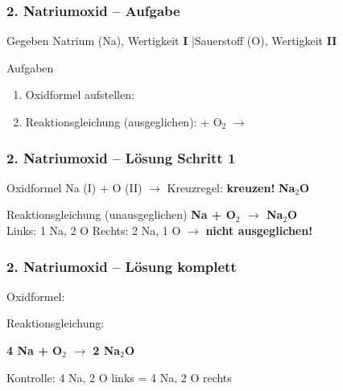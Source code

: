 \documentclass[aspectratio=169, 12pt]{beamer}
\newcommand{\lsg}[1]{\textcolor{loesung}{\textbf{#1}}}
\newcommand{\luecke}{\underline{\hspace{2.5cm}}}
\begin{document}
\begin{frame}
\frametitle{2. Natriumoxid – Aufgabe}
\begin{block}{Gegeben}
Natrium (Na), Wertigkeit \textbf{I} \quad|\quad Sauerstoff (O), Wertigkeit \textbf{II}
\end{block}
\vspace{0.5cm}
\begin{block}{Aufgaben}
\begin{enumerate}
\item Oxidformel aufstellen: \luecke
\item Reaktionsgleichung (ausgeglichen): \quad \luecke{} + O$_2$ $\rightarrow$ \luecke
\end{enumerate}
\end{block}
\end{frame}

\begin{frame}
\frametitle{2. Natriumoxid – Lösung Schritt 1}
\begin{block}{Oxidformel}
Na (I) + O (II) $\rightarrow$ Kreuzregel: \textbf{kreuzen!} \hfill \lsg{Na$_2$O}
\end{block}
\vspace{0.3cm}
\begin{block}{Reaktionsgleichung (unausgeglichen)}
\lsg{Na + O$_2$ $\rightarrow$ Na$_2$O}\\[0.3cm]
Links: 1 Na, 2 O \quad Rechts: 2 Na, 1 O \quad $\rightarrow$ \textbf{nicht ausgeglichen!}
\end{block}
\end{frame}

\begin{frame}
\frametitle{2. Natriumoxid – Lösung komplett}
\begin{center}
\vspace{0.5cm}
{\large Oxidformel:} \quad {\Huge \lsg{Na$_2$O}}
\vspace{1cm}

{\large Reaktionsgleichung:}
\vspace{0.5cm}

{\Huge \lsg{4 Na + O$_2$ $\rightarrow$ 2 Na$_2$O}}
\vspace{0.5cm}

{\small Kontrolle: 4 Na, 2 O links = 4 Na, 2 O rechts \checkmark}
\end{center}
\end{frame}
\end{document}
